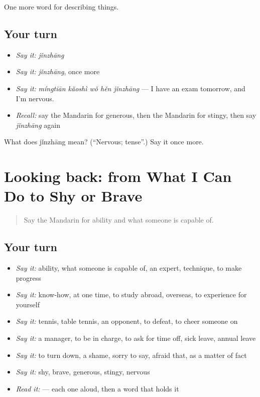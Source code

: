 \begin{grammarlens}[title={What you've built}]
One more word for describing things.
\end{grammarlens}

\subsection*{Your turn}
\begin{itemize}
\raggedright
  \item \emph{Say it:} \emph{jǐnzhāng}
  \item \emph{Say it:} \emph{jǐnzhāng}, once more
  \item \emph{Say it:} \emph{míngtiān kǎoshì wǒ hěn jǐnzhāng} — I have an exam tomorrow, and I'm nervous.
  \item \emph{Recall:} say the Mandarin for generous, then the Mandarin for stingy, then say \emph{jǐnzhāng} again
\end{itemize}

\begin{tcolorbox}[breakable,colback=teal!4,colframe=teal!35!black,title={Before you move on}]
What does jǐnzhāng mean? (\textquotedblleft{}Nervous; tense\textquotedblright{}.) Say it once more.
\end{tcolorbox}
\section[(dialogue)]{Looking back: from What I Can Do to Shy or Brave}

\label{lesson:ZH-R265-review-260-265}



\begin{quote}
Say the Mandarin for ability and what someone is capable of.
\end{quote}

\subsection*{Your turn}
\begin{itemize}
\raggedright
  \item \emph{Say it:} ability, what someone is capable of, an expert, technique, to make progress
  \item \emph{Say it:} know-how, at one time, to study abroad, overseas, to experience for yourself
  \item \emph{Say it:} tennis, table tennis, an opponent, to defeat, to cheer someone on
  \item \emph{Say it:} a manager, to be in charge, to ask for time off, sick leave, annual leave
  \item \emph{Say it:} to turn down, a shame, sorry to say, afraid that, as a matter of fact
  \item \emph{Say it:} shy, brave, generous, stingy, nervous
  \item \emph{Read it:}  — each one aloud, then a word that holds it
\end{itemize}

